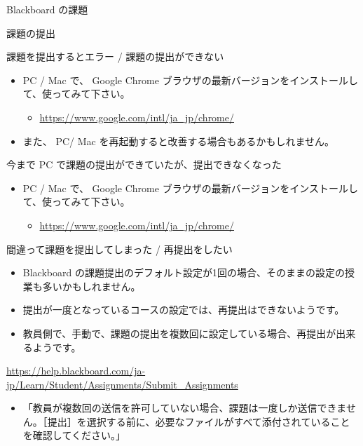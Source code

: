 \documentclass[a4j,10pt]{jsarticle}
\begin{document}
{\newpage\clearpage
{}%
\begin{frame}[label={sec:org6cf18dd},fragile]{Blackboard の課題}
\begin{block}{課題の提出}
\begin{block}{課題を提出するとエラー / 課題の提出ができない}
\begin{itemize}
\item PC / Mac で、 Google Chrome ブラウザの最新バージョンをインストールして、使ってみて下さい。
\begin{itemize}
\item \url{https://www.google.com/intl/ja\_jp/chrome/}
\end{itemize}
\par
\item また、 PC/ Mac を再起動すると改善する場合もあるかもしれません。
\end{itemize}
\end{block}
\par
\begin{block}{今まで PC で課題の提出ができていたが、提出できなくなった}
\begin{itemize}
\item PC / Mac で、 Google Chrome ブラウザの最新バージョンをインストールして、使ってみて下さい。
\begin{itemize}
\item \url{https://www.google.com/intl/ja\_jp/chrome/}
\end{itemize}
\end{itemize}
\end{block}
\par
\begin{block}{間違って課題を提出してしまった / 再提出をしたい}
\begin{itemize}
\item Blackboard の課題提出のデフォルト設定が1回の場合、そのままの設定の授業も多いかもしれません。
\item 提出が一度となっているコースの設定では、再提出はできないようです。
\item 教員側で、手動で、課題の提出を複数回に設定している場合、再提出が出来るようです。
\end{itemize}
\par
\url{https://help.blackboard.com/ja-jp/Learn/Student/Assignments/Submit\_Assignments}
\par
\begin{itemize}
\item 「教員が複数回の送信を許可していない場合、課題は一度しか送信できません。［提出］を選択する前に、必要なファイルがすべて添付されていることを確認してください。」

\end{itemize}
\end{block}
\end{block}
\end{frame}}
\end{document}
